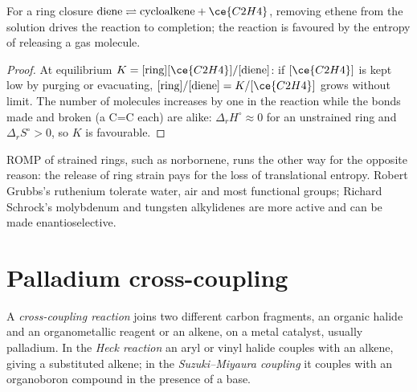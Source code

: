 \begin{proposition}\label{prop:b3:homogeneous-catalysis:metathesis-equilibrium}
For a ring closure $\text{diene} \rightleftharpoons \text{cycloalkene} + \ce{C2H4}$, removing ethene from the
solution drives the reaction to completion; the reaction is favoured by the
entropy of releasing a gas molecule.
\end{proposition}

\begin{proof}
At equilibrium $K = [\text{ring}][\ce{C2H4}]/[\text{diene}]$: if $[\ce{C2H4}]$ is kept low by purging or
evacuating, $[\text{ring}]/[\text{diene}] = K/[\ce{C2H4}]$ grows without limit. The number of molecules
increases by one in the reaction while the bonds made and broken (a C=C each) are
alike: $\Delta_rH^\circ \approx 0$ for an unstrained ring and $\Delta_rS^\circ > 0$, so $K$ is favourable.
\end{proof}

ROMP of strained rings, such as norbornene, runs the other way for the opposite
reason: the release of ring strain pays for the loss of translational entropy.
Robert Grubbs's ruthenium  tolerate water, air and most functional
groups; Richard Schrock's molybdenum and tungsten alkylidenes are more active
and can be made enantioselective.

\section{Palladium cross-coupling}

\begin{definition}\label{def:b3:homogeneous-catalysis:cross-coupling}
A \emph{cross-coupling reaction} joins two
different carbon fragments, an organic halide and an organometallic reagent or an
alkene, on a metal catalyst, usually palladium. In the \emph{Heck
reaction} an aryl or vinyl halide couples with an alkene,
giving a substituted alkene; in the \emph{Suzuki--Miyaura
coupling} it couples with an organoboron
compound in the presence of a base.
\end{definition}

